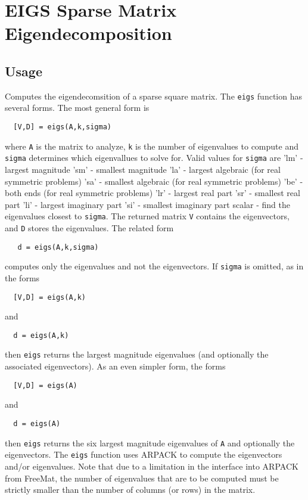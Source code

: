 \section{EIGS Sparse Matrix Eigendecomposition}

\subsection{Usage}

Computes the eigendecomsition of a sparse square matrix.  The
\verb|eigs| function has several forms.  The most general form is
\begin{verbatim}
  [V,D] = eigs(A,k,sigma)
\end{verbatim}
where \verb|A| is the matrix to analyze, \verb|k| is the number of
eigenvalues to compute and \verb|sigma| determines which eigenvallues
to solve for.  Valid values for \verb|sigma| are
   'lm' - largest magnitude 
   'sm' - smallest magnitude
   'la' - largest algebraic (for real symmetric problems)
   'sa' - smallest algebraic (for real symmetric problems)
   'be' - both ends (for real symmetric problems)
   'lr' - largest real part 
   'sr' - smallest real part
   'li' - largest imaginary part
   'si' - smallest imaginary part
 scalar - find the eigenvalues closest to \verb|sigma|.
The returned matrix \verb|V| contains the eigenvectors, and \verb|D|
stores the eigenvalues.  The related form
\begin{verbatim}
   d = eigs(A,k,sigma)
\end{verbatim}
computes only the eigenvalues and not the eigenvectors.  If \verb|sigma|
is omitted, as in the forms
\begin{verbatim}
  [V,D] = eigs(A,k)
\end{verbatim}
and
\begin{verbatim}
  d = eigs(A,k)
\end{verbatim}
then \verb|eigs| returns the largest magnitude eigenvalues (and optionally
the associated eigenvectors).  As an even simpler form, the forms
\begin{verbatim}
  [V,D] = eigs(A)
\end{verbatim}
and
\begin{verbatim}
  d = eigs(A)
\end{verbatim}
then \verb|eigs| returns the six largest magnitude eigenvalues of \verb|A| and
optionally the eigenvectors.  The \verb|eigs| function uses ARPACK to
compute the eigenvectors and/or eigenvalues.  Note that due to a 
limitation in the interface into ARPACK from FreeMat, the number of
eigenvalues that are to be computed must be strictly smaller than the
number of columns (or rows) in the matrix.
